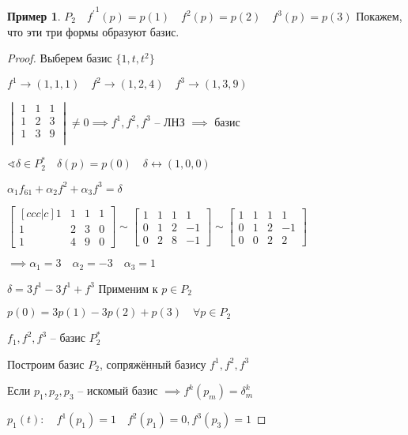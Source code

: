 \documentclass{book}
\newcommand{\p}[1]{#1^{\prime}}
\theoremstyle{definition}
\newtheorem*{example}{Пример}
\begin{document}
        \begin{example}
            $P_2\quad {\p f}^1(p) = p(1)\quad f^2(p) = p(2)\quad f^3(p) = p(3)$ Покажем, что эти три формы образуют базис.
        \end{example}
        \begin{proof}
            Выберем базис $\{1, t, t^2\}$

            $f^1 \to (1,1,1)\quad f^2 \to (1,2,4)\quad f^3 \to (1,3,9)$

            $
            \begin{vmatrix}
                1&1&1\\1&2&3\\1&3&9\\
            \end{vmatrix}\neq 0 \implies f^1, f^2, f^3$ -- ЛНЗ $\implies $ базис 

            $\sphericalangle \delta \in P_2^*\quad\delta(p) = p(0)\quad \delta \leftrightarrow (1, 0, 0)$

            $\alpha_1f_{61} + \alpha_2f^2 + \alpha_3f^3 = \delta$

            $\begin{bmatrix}[c c c|c] 1&1&1&1\\1&2&3&0\\1&4&9&0 \end{bmatrix} \sim \begin{bmatrix} 1&1&1&1\\0&1&2&-1\\0&2&8&-1 \end{bmatrix} \sim \begin{bmatrix} 1&1&1&1\\0&1&2&-1\\0&0&2&2 \end{bmatrix} $

            $\implies \alpha_1 = 3\quad \alpha_2 = -3\quad \alpha_3 = 1$

            $\delta = 3f^1-3f^1+f^3$ Применим к  $p\in P_2$

            $p(0) = 3p(1) - 3p(2) + p(3)\quad \forall p\in P_2$

            $f_{1}, f^2, f^3$ -- базис $P_2^*$

            Построим базис  $P_2$, сопряжённый базису $f^1, f^2, f^3$

            Если  $p_1, p_2, p_3$ -- искомый базис $\implies f^k(p_m) = \delta_m^k$

            $p_1(t):\quad f^1(p_1) = 1\quad f^2(p_1) = 0, f^3(p_3) = 1$


\end{proof}
\end{document}
